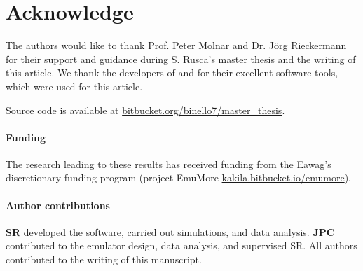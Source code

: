 \documentclass[12pt,a4paper,english,twocolumn,fleqn]{narms}
\begin{document}

\section{Acknowledge}
The authors would like to thank Prof. Peter Molnar and Dr. Jörg Rieckermann for their support and guidance during S. Rusca's master thesis and the writing of this article.
We thank the developers of  and  for their excellent software tools, which were used for this article.

Source code is available at \url{bitbucket.org/binello7/master_thesis}.

\paragraph*{Funding} The research leading to these results has received funding from the Eawag's discretionary funding program (project EmuMore \url{kakila.bitbucket.io/emumore}).

\paragraph*{Author contributions} \textbf{SR} developed the software, carried out simulations, and data analysis. \textbf{JPC} contributed to the emulator design, data analysis, and supervised SR. All authors contributed to the writing of this manuscript.

\sloppy


\end{document}
